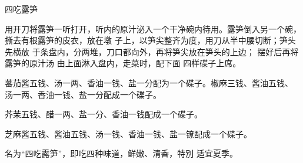 \begin{recipe}{四吃露笋}

\ingredients


\cooking

\step 用开刀将露笋一听打开，听内的原汁泌入一个干净碗内待用。露笋倒入另一个碗，
撕去有根露笋的皮衣，放在墩 子上，以笋尖整齐为度，用刀从半中腰切断；笋头先横放
于条盘内，分两堆，刀口都向外，再将笋尖放在笋头的上边； 摆好后再将露笋的原汁汤
由上面淋入盘内，走菜时，配下面 四样碟子上席。

\step 蕃茄酱五钱、汤一两、香油一钱、盐一分配为一个碟子。椒麻三钱、酱油五钱、
汤一两、香油一钱、盐一分配成一个碟子。

\step 芥茉五钱、醋一两、盐一分、香油一钱配成一个碟子。

\step 芝麻酱五钱、酱油五钱、汤一钱、香油一钱、盐一镣配成一个碟子。

\features

名为“四吃露笋”，即吃四种味道，鲜嫩、清香，特別 适宜夏季。

\end{recipe}

